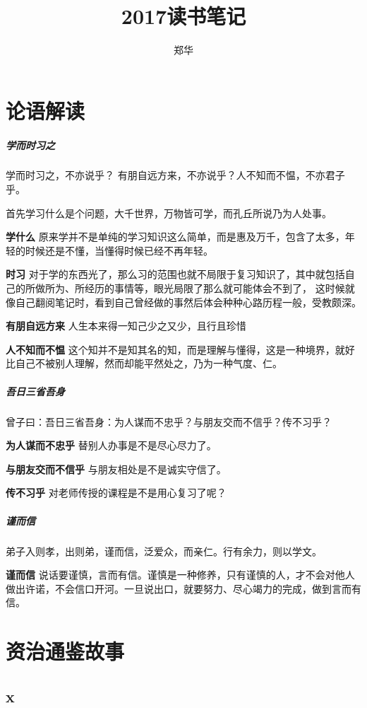 \documentclass[UTF8,a4paper,8pt]{ctexart}
\author{郑华}
\title{2017读书笔记}
\begin{document}
	\maketitle
	\tableofcontents
	
	\newpage
	\section{论语解读}
		\subparagraph{学而时习之}
			学而时习之，不亦说乎？ 有朋自远方来，不亦说乎？人不知而不愠，不亦君子乎。
			
			首先学习什么是个问题，大千世界，万物皆可学，而孔丘所说乃为人处事。
			
			\textbf{学什么} 原来学并不是单纯的学习知识这么简单，而是惠及万千，包含了太多，年轻的时候还是不懂，当懂得时候已经不再年轻。
			
			\textbf{时习} 对于学的东西光了，那么习的范围也就不局限于复习知识了，其中就包括自己的所做所为、所经历的事情等，眼光局限了那么就可能体会不到了， 这时候就像自己翻阅笔记时，看到自己曾经做的事然后体会种种心路历程一般，受教颇深。
			
			\textbf{有朋自远方来} 人生本来得一知己少之又少，且行且珍惜
			
			\textbf{人不知而不愠} 这个知并不是知其名的知，而是理解与懂得，这是一种境界，就好比自己不被别人理解，然而却能平然处之，乃为一种气度、仁。
		
		\subparagraph{吾日三省吾身}
			曾子曰：吾日三省吾身：为人谋而不忠乎？与朋友交而不信乎？传不习乎？
			
			\textbf{为人谋而不忠乎} 替别人办事是不是尽心尽力了。
			
			\textbf{与朋友交而不信乎} 与朋友相处是不是诚实守信了。
			
			\textbf{传不习乎} 对老师传授的课程是不是用心复习了呢？
		
		\subparagraph{谨而信}
			弟子入则孝，出则弟，谨而信，泛爱众，而亲仁。行有余力，则以学文。
			
			\textbf{谨而信} 说话要谨慎，言而有信。谨慎是一种修养，只有谨慎的人，才不会对他人做出许诺，不会信口开河。一旦说出口，就要努力、尽心竭力的完成，做到言而有信。
	
	\newpage
	\section{资治通鉴故事}
		\subsection{x}
		
\end{document}
